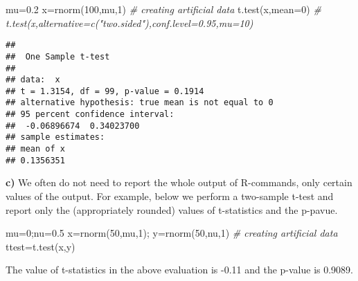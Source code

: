 \documentclass[
  11pt,
]{article}
\newenvironment{Shaded}{\begin{snugshade}}{\end{snugshade}}
\newcommand{\AttributeTok}[1]{\textcolor[rgb]{0.77,0.63,0.00}{#1}}
\newcommand{\CommentTok}[1]{\textcolor[rgb]{0.56,0.35,0.01}{\textit{#1}}}
\newcommand{\DecValTok}[1]{\textcolor[rgb]{0.00,0.00,0.81}{#1}}
\newcommand{\FloatTok}[1]{\textcolor[rgb]{0.00,0.00,0.81}{#1}}
\newcommand{\FunctionTok}[1]{\textcolor[rgb]{0.00,0.00,0.00}{#1}}
\newcommand{\NormalTok}[1]{#1}
\newcommand{\OtherTok}[1]{\textcolor[rgb]{0.56,0.35,0.01}{#1}}
\begin{document}
\begin{Shaded}
\begin{Highlighting}[]
\NormalTok{mu}\OtherTok{=}\FloatTok{0.2}
\NormalTok{x}\OtherTok{=}\FunctionTok{rnorm}\NormalTok{(}\DecValTok{100}\NormalTok{,mu,}\DecValTok{1}\NormalTok{) }\CommentTok{\# creating artificial data}
\FunctionTok{t.test}\NormalTok{(x,}\AttributeTok{mean=}\DecValTok{0}\NormalTok{)   }\CommentTok{\# t.test(x,alternative=c("two.sided"),conf.level=0.95,mu=10)}
\end{Highlighting}
\end{Shaded}

\begin{verbatim}
## 
##  One Sample t-test
## 
## data:  x
## t = 1.3154, df = 99, p-value = 0.1914
## alternative hypothesis: true mean is not equal to 0
## 95 percent confidence interval:
##  -0.06896674  0.34023700
## sample estimates:
## mean of x 
## 0.1356351
\end{verbatim}

\textbf{c)} We often do not need to report the whole output of
R-commands, only certain values of the output. For example, below we
perform a two-sample t-test and report only the (appropriately rounded)
values of t-statistics and the p-pavue.

\begin{Shaded}
\begin{Highlighting}[]
\NormalTok{mu}\OtherTok{=}\DecValTok{0}\NormalTok{;nu}\OtherTok{=}\FloatTok{0.5}
\NormalTok{x}\OtherTok{=}\FunctionTok{rnorm}\NormalTok{(}\DecValTok{50}\NormalTok{,mu,}\DecValTok{1}\NormalTok{); y}\OtherTok{=}\FunctionTok{rnorm}\NormalTok{(}\DecValTok{50}\NormalTok{,nu,}\DecValTok{1}\NormalTok{) }\CommentTok{\# creating artificial data}
\NormalTok{ttest}\OtherTok{=}\FunctionTok{t.test}\NormalTok{(x,y) }
\end{Highlighting}
\end{Shaded}

The value of t-statistics in the above evaluation is -0.11 and the
p-value is 0.9089.
\end{document}
